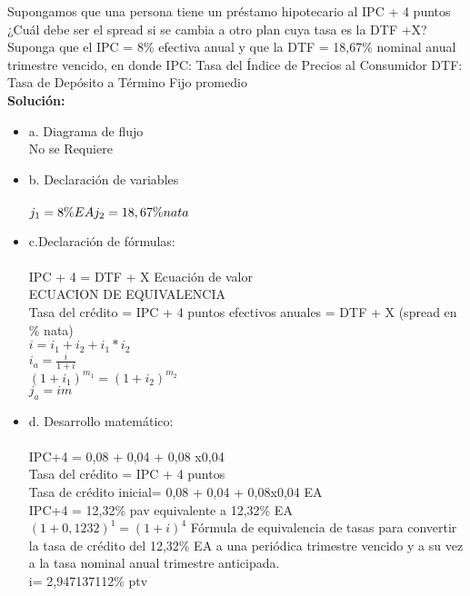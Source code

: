 	Supongamos que una persona tiene un préstamo hipotecario al IPC + 4 puntos ¿Cuál debe ser el spread si se cambia a otro plan cuya tasa es la DTF +X? Suponga que el IPC = 8\% efectiva anual y que la DTF = 18,67\% nominal anual trimestre vencido, en donde
IPC: Tasa del Índice de Precios al Consumidor
DTF: Tasa de Depósito a Término Fijo promedio \\
	
	\textbf{Solución:}\
	\\
	
	\begin{itemize}
		\item a. Diagrama de flujo\\
		No se Requiere \\
		\item b. Declaración de variables\\\\
		$j_{1}= 8\% EA \\ j_{2} = 18,67\% nata$\\
		\item c.Declaración de fórmulas:\\\\
		IPC + 4 = DTF + X  Ecuación de valor\\
		ECUACION DE EQUIVALENCIA \\
        
        Tasa del crédito = IPC + 4 puntos efectivos anuales = DTF + X (spread en \% nata) \\
        $i = i_1 + i_2 +i_1 * i_2$ \\
		$i_{a}= \frac{i}{1+i}$\\
		$(1 + i_{1})^{m_{1}} = (1 +i_{2})^{m_{2}}$\\
		$j_{a} = i m$\\
		\item d. Desarrollo matemático:\\\\
		IPC+4 = 0,08 + 0,04 + 0,08 x0,04\\
		Tasa del crédito = IPC + 4 puntos\\
        Tasa de crédito inicial= 0,08 + 0,04 + 0,08x0,04 EA\\
		IPC+4 = 12,32\% pav equivalente a 12,32\% EA \\
		$(1 + 0,1232)^1 = (1 + i) ^4$ Fórmula de equivalencia de tasas para convertir la tasa de crédito del 12,32\% EA a una periódica trimestre vencido y a su vez a la tasa nominal anual trimestre anticipada.\\
		i= 2,947137112\% ptv\\
		

\end{itemize}
